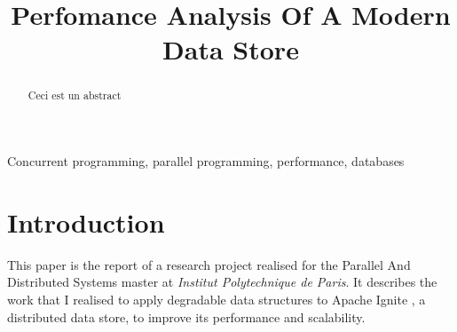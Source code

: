 \documentclass[conference]{IEEEtran}
\begin{document}
\title{Perfomance Analysis Of A Modern Data Store}

\author{
}

\maketitle
\thispagestyle{plain}
\pagestyle{plain}

\begin{abstract}
Ceci est un abstract
\end{abstract}

\begin{IEEEkeywords}
Concurrent programming, parallel programming, performance, databases
\end{IEEEkeywords}

\section{Introduction}
This paper is the report of a research project realised for the Parallel And Distributed Systems master at \textit{Institut Polytechnique de Paris}. It describes the work that I realised to apply degradable data structures to Apache Ignite \cite{ignite}, a distributed data store, to improve its performance and scalability.
\end{document}
